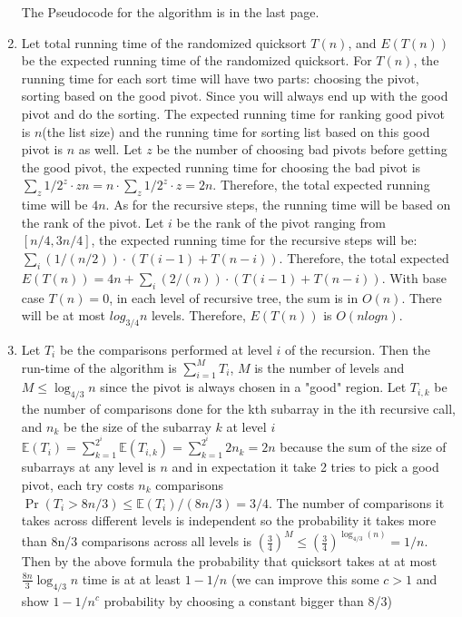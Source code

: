 \documentclass[11pt]{article}%
\begin{document}
\begin{questions}[1]
\begin{enumerate}
\begin{enumerate}
    \end{enumerate}
    The Pseudocode for the algorithm is in the last page.
    \item   Let total running time of the randomized quicksort $T(n)$, and $E(T(n))$ be the expected running time of the randomized quicksort. For $T(n)$, the running time for each sort time will have two parts: choosing the pivot, sorting based on the good pivot. Since you will always end up with the good pivot and do the sorting. The expected running time for ranking good pivot is $n$(the list size) and the running time for sorting list based on this good pivot is $n$ as well. Let $z$ be the number of choosing bad pivots before getting the good pivot, the expected running time for choosing the bad pivot is $\sum_z 1/2^z \cdot zn = n \cdot \sum_z 1/2^z  \cdot z = 2n$. Therefore, the total expected running time will be $4n$. As for the recursive steps, the running time will be based on the rank of the pivot. Let $i$ be the rank of the pivot ranging from $[n/4,3n/4]$, the expected running time for the recursive steps will be: $\sum_i (1/(n/2))\cdot(T(i-1) + T(n-i))$. Therefore, the total expected $E(T(n)) = 4n + \sum_i (2/(n))\cdot(T(i-1) + T(n-i))$. With base case $T(n) = 0$, in each level of recursive tree, the sum is in $O(n)$. There will be at most $log_{3/4} n$ levels. Therefore, $E(T(n))$ is  $O(nlogn)$.
    \item  
    Let $T_i$ be the comparisons performed at level $i$ of the recursion. Then the run-time of the algorithm is $\sum_{i =1}^{M}T_i$, $M$ is the number of levels and $M \leq \log_{4/3}n$ since the pivot is always chosen in a "good" region. Let $T_{i,k}$ be the number of comparisons done for the kth subarray in the ith recursive call, and $n_k$ be the size of the subarray $k$ at level $i$ \\
    $\mathbb{E}(T_i) = \sum_{k=1}^{2^i}\mathbb{E}(T_{i,k}) = \sum_{k=1}^{2^i}2n_k = 2n$ because the sum of the size of subarrays at any level is $n$ and in expectation it take 2 tries to pick a good pivot, each try costs $n_k$ comparisons  \\
    $\Pr(T_i > 8n/3) \leq \mathbb{E}(T_i)/(8n/3) = 3/4$. The number of comparisons it takes across different levels is independent so the probability it takes more than 8n/3 comparisons across all levels is $(\frac{3}{4})^M \leq (\frac{3}{4})^{\log_{4/3}(n)} = 1/n$. \\
    Then by the above formula the probability that quicksort takes at at most $\frac{8n}{3}\log_{4/3}n$ time is at at least $1- 1/n$ (we can improve this some $c >1$ and show $1 - 1/n^c$ probability by choosing a constant bigger than 8/3)

\end{enumerate}
\end{questions}
\end{document}
